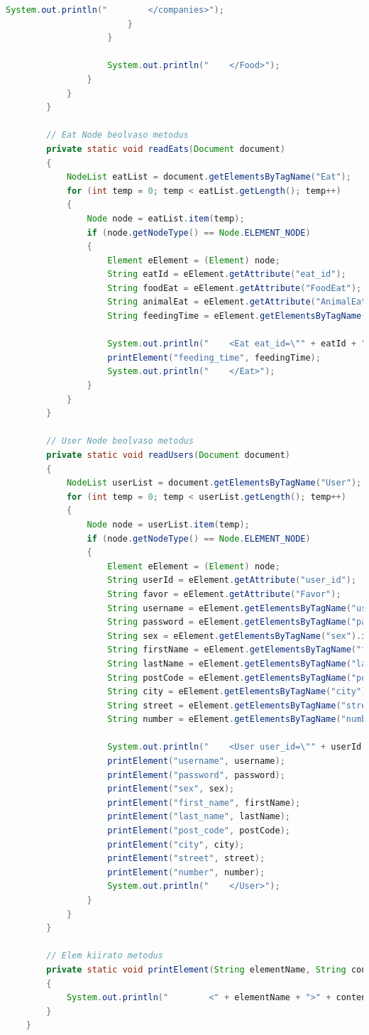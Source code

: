 \documentclass[12pt]{report}
\begin{document}
\begin{lstlisting}[caption={DOMReadKLNSPG.java} adatolvasó program, language=Java]
							System.out.println("        </companies>");
						}
					}
					
					System.out.println("    </Food>");
				}
			}
		}    
		
		// Eat Node beolvaso metodus
		private static void readEats(Document document) 
		{
			NodeList eatList = document.getElementsByTagName("Eat");
			for (int temp = 0; temp < eatList.getLength(); temp++) 
			{
				Node node = eatList.item(temp);
				if (node.getNodeType() == Node.ELEMENT_NODE) 
				{
					Element eElement = (Element) node;
					String eatId = eElement.getAttribute("eat_id");
					String foodEat = eElement.getAttribute("FoodEat");
					String animalEat = eElement.getAttribute("AnimalEat");
					String feedingTime = eElement.getElementsByTagName("feeding_time").item(0).getTextContent();
					
					System.out.println("    <Eat eat_id=\"" + eatId + "\" FoodEat=\"" + foodEat + "\" AnimalEat=\"" + animalEat + "\">");
					printElement("feeding_time", feedingTime);
					System.out.println("    </Eat>");
				}
			}
		}
		
		// User Node beolvaso metodus
		private static void readUsers(Document document)
		{
			NodeList userList = document.getElementsByTagName("User");
			for (int temp = 0; temp < userList.getLength(); temp++) 
			{
				Node node = userList.item(temp);
				if (node.getNodeType() == Node.ELEMENT_NODE) 
				{
					Element eElement = (Element) node;
					String userId = eElement.getAttribute("user_id");
					String favor = eElement.getAttribute("Favor");
					String username = eElement.getElementsByTagName("username").item(0).getTextContent();
					String password = eElement.getElementsByTagName("password").item(0).getTextContent();
					String sex = eElement.getElementsByTagName("sex").item(0).getTextContent();
					String firstName = eElement.getElementsByTagName("first_name").item(0).getTextContent();
					String lastName = eElement.getElementsByTagName("last_name").item(0).getTextContent();
					String postCode = eElement.getElementsByTagName("post_code").item(0).getTextContent();
					String city = eElement.getElementsByTagName("city").item(0).getTextContent();
					String street = eElement.getElementsByTagName("street").item(0).getTextContent();
					String number = eElement.getElementsByTagName("number").item(0).getTextContent();
					
					System.out.println("    <User user_id=\"" + userId + "\" Favor=\"" + favor + "\">");
					printElement("username", username);
					printElement("password", password);
					printElement("sex", sex);
					printElement("first_name", firstName);
					printElement("last_name", lastName);
					printElement("post_code", postCode);
					printElement("city", city);
					printElement("street", street);
					printElement("number", number);
					System.out.println("    </User>");
				}
			}
		}
		
		// Elem kiirato metodus
		private static void printElement(String elementName, String content)
		{
			System.out.println("        <" + elementName + ">" + content + "</" + elementName + ">");
		}
	}
\end{lstlisting}
\end{document}
